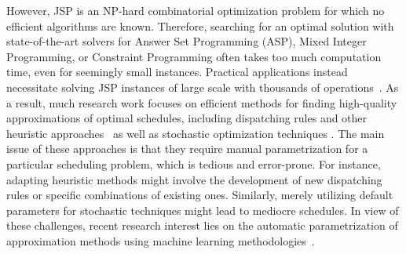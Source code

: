 \documentclass[runningheads]{llncs}
\begin{document}
However, JSP is an NP-hard combinatorial optimization problem \cite{garey1976complexity,SOTSKOV1995237} for which no efficient algorithms are known. Therefore, searching for an optimal solution with state-of-the-art solvers for Answer Set Programming (ASP), Mixed Integer Programming, or Constraint Programming \cite{meng2020mixed,coltep19a,el2020job,al2017job}
often takes too much computation time, even for seemingly small instances. Practical applications instead necessitate solving JSP instances of large scale with thousands of operations~\cite{zhang2010hybrid}.
As a result, much research work focuses on %
efficient methods for finding high-quality approximations of optimal schedules, including dispatching rules and other heuristic approaches~\cite{blackstone1982state} as well as stochastic optimization techniques \cite{DBLP:journals/informs/VaessensAL96,DBLP:journals/jim/CalisB15}.  
The main issue of these approaches is that they require manual parametrization for a particular scheduling problem, which is tedious and error-prone. For instance, adapting heuristic methods might involve the development of new dispatching rules or specific combinations of existing ones. Similarly, merely utilizing default parameters for stochastic techniques might lead to mediocre schedules.    
In view of these challenges, recent research interest lies on the automatic parametrization of approximation methods using machine learning methodologies~\cite{bengio2020machine}.



\end{document}
